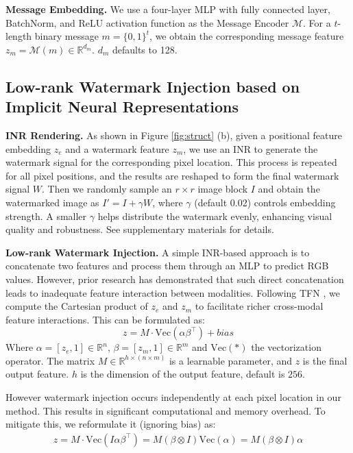 \documentclass{article}
\begin{document}
\textbf{Message Embedding.} We use a four-layer MLP with fully connected layer, BatchNorm, and ReLU activation function as the Message Encoder $\mathcal{M}$. For a \( t \)-length binary message \( m = \{0, 1\}^t \), we obtain the corresponding message feature \( z_m = \mathcal{M}(m) \in \mathbb{R}^{d_m}  \). $d_m$ defaults to 128. 

\subsection{Low-rank Watermark Injection based on Implicit Neural Representations} \label{low_rank}

\textbf{INR Rendering.} As shown in Figure \ref{fig:struct} (b), given a positional feature embedding \( z_e \) and a watermark feature \( z_m \),  we use an INR to generate the watermark signal for the corresponding pixel location. This process is repeated for all pixel positions, and the results are reshaped to form the final watermark signal $W$. Then we randomly sample an \( r \times r \) image block \( I \) and obtain the watermarked image as \( I' = I + \gamma W \), where \( \gamma \) (default 0.02) controls embedding strength. A smaller \( \gamma \) helps distribute the watermark evenly, enhancing visual quality and robustness. See supplementary materials for details.


\textbf{Low-rank Watermark Injection.} A simple INR-based approach is to concatenate two features and process them through an MLP to predict RGB values. However, prior research \cite{zadeh2017tensor, liu2018efficient} has demonstrated that such direct concatenation leads to inadequate feature interaction between modalities. Following TFN \cite{zadeh2017tensor}, we compute the Cartesian product of \( z_e \) and \( z_m \) to facilitate richer cross-modal feature interactions. This can be formulated as:
\begin{equation}
    z =M \cdot \mathrm{Vec}(\alpha \beta^\top)+bias
\end{equation}
Where \( \alpha = [z_e, 1] \in \mathbb{R}^n \), \( \beta = [z_m, 1] \in \mathbb{R}^m \) and \( \mathrm{Vec}(*) \) the vectorization operator. The matrix \( M \in \mathbb{R}^{h \times (n \times m)} \) is a learnable parameter, and \( z \) is the final output feature. $h$ is the dimension of the output feature, default is $256$.

However watermark injection occurs independently at each pixel location in our method. This results in significant computational and memory overhead. To mitigate this, we reformulate it (ignoring bias) as:
\begin{equation}
     \begin{aligned}
         z=M\cdot \mathrm{Vec}(I\alpha\beta^\top)
     =M(\beta\otimes I)\mathrm{Vec}(\alpha)=M(\beta\otimes I)\alpha 
     \end{aligned}  
\end{equation}
\end{document}
